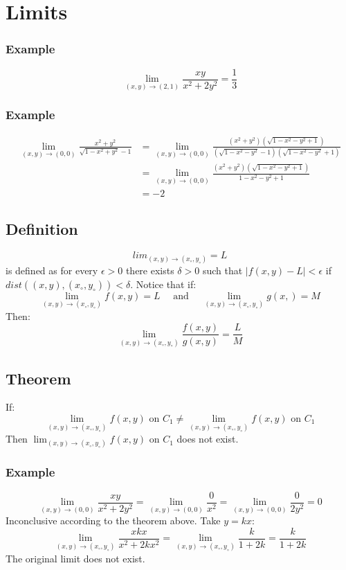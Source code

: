 \documentclass{math}
\begin{document}
\section*{Limits}

\subsubsection*{Example}
\[ \lim_{(x,y)\to(2,1)}\frac{xy}{x^2+2y^2} = \frac{1}{3} \]

\subsubsection*{Example}
\begin{align*}
  \lim_{(x,y)\to(0,0)}\frac{x^2+y^2}{\sqrt{1-x^2+y^2}-1} &=
    \lim_{(x,y)\to(0,0)}\frac{(x^2+y^2)(\sqrt{1-x^2-y^2+1})}
    {(\sqrt{1-x^2-y^2}-1)(\sqrt{1-x^2-y^2}+1)} \\
  &= \lim_{(x,y)\to(0,0)}\frac{(x^2+y^2)(\sqrt{1-x^2-y^2+1})}
    {1-x^2-y^2+1} \\
  &= -2
\end{align*}

\subsection*{Definition}
\[ lim_{(x,y)\to(x_{\circ},y_{\circ})} = L \]
is defined as for every \( \epsilon > 0 \) there exists \( \delta > 0 \) such
that \( |f(x,y)-L| < \epsilon \) if \( dist((x,y),(x_{\circ},y_{\circ}))
< \delta \). Notice that if:
\[ \lim_{(x,y)\to(x_{\circ},y_{\circ})}f(x,y) = L \quad\text{ and }\quad
  \lim_{(x,y)\to(x_{\circ},y_{\circ})}g(x,) = M \]
Then:
\[ \lim_{(x,y)\to(x_{\circ},y_{\circ})}\frac{f(x,y)}{g(x,y)} = \frac{L}{M} \]

\subsection*{Theorem}
If:
\[ \lim_{(x,y)\to(x_{\circ},y_{\circ})}f(x,y)\text{ on }C_1 \ne
  \lim_{(x,y)\to(x_{\circ},y_{\circ})}f(x,y)\text{ on }C_1 \]
Then \( \lim_{(x,y)\to(x_{\circ},y_{\circ})}f(x,y)\text{ on }C_1 \) does not
exist.

\subsubsection*{Example}
\[ \lim_{(x,y)\to(0,0)}\frac{xy}{x^2+2y^2} = \lim_{(x,y)\to(0,0)}\frac{0}{x^2} =
  \lim_{(x,y)\to(0,0)}\frac{0}{2y^2} = 0 \]
Inconclusive according to the theorem above. Take \( y = kx \):
\[ \lim_{(x,y)\to(x_{\circ},y_{\circ})}\frac{xkx}{x^2+2kx^2} =
  \lim_{(x,y)\to(x_{\circ},y_{\circ})}\frac{k}{1+2k} = \frac{k}{1+2k} \]
The original limit does not exist.
\end{document}
